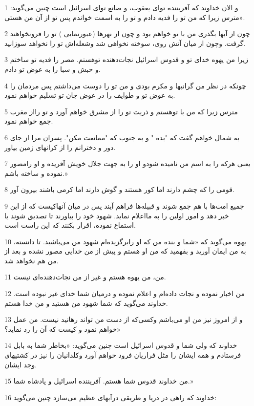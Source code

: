 \par 1 و الان خداوند که آفریننده تو‌ای یعقوب، و صانع تو‌ای اسرائیل است چنین می‌گوید: «مترس زیرا که من تو را فدیه دادم و تو را به اسمت خواندم پس تو از آن من هستی.
\par 2 چون از آبها بگذری من با تو خواهم بود و چون از نهرها (عبورنمایی ) تو را فرونخواهند گرفت. وچون از میان آتش روی، سوخته نخواهی شد وشعله‌اش تو را نخواهد سوزانید.
\par 3 زیرا من یهوه خدای تو و قدوس اسرائیل نجات‌دهنده توهستم. مصر را فدیه تو ساختم و حبش و سبا را به عوض تو دادم.
\par 4 چونکه در نظر من گرانبها و مکرم بودی و من تو را دوست می‌داشتم پس مردمان را به عوض تو و طوایف را در عوض جان تو تسلیم خواهم نمود.
\par 5 مترس زیرا که من با توهستم و ذریت تو را از مشرق خواهم آورد و تو رااز مغرب جمع خواهم نمود.
\par 6 به شمال خواهم گفت که "بده " و به جنوب که "ممانعت مکن". پسران مرا از جای دور و دخترانم را از کرانهای زمین بیاور.
\par 7 یعنی هر‌که را به اسم من نامیده شودو او را به جهت جلال خویش آفریده و او رامصور نموده و ساخته باشم.» 
\par 8 قومی را که چشم دارند اما کور هستند و گوش دارند اما کرمی باشند بیرون آور.
\par 9 جمیع امت‌ها با هم جمع شوند و قبیله‌ها فراهم آیند پس در میان آنهاکیست که از این خبر دهد و امور اولین را به مااعلام نماید. شهود خود را بیاورند تا تصدیق شوند یا استماع نموده، اقرار بکنند که این راست است.
\par 10 یهوه می‌گوید که «شما و بنده من که او رابرگزیده‌ام شهود من می‌باشید. تا دانسته، به من ایمان آورید و بفهمید که من او هستم و پیش از من خدایی مصور نشده و بعد از من هم نخواهد شد.
\par 11 من، من یهوه هستم و غیر از من نجات‌دهنده‌ای نیست.
\par 12 من اخبار نموده و نجات داده‌ام و اعلام نموده و درمیان شما خدای غیر نبوده است. خداوند می‌گوید که شما شهود من هستید و من خدا هستم.
\par 13 و از امروز نیز من او می‌باشم وکسی‌که از دست من تواند رهانید نیست. من عمل خواهم نمود و کیست که آن را رد نماید؟»
\par 14 خداوند که ولی شما و قدوس اسرائیل است چنین می‌گوید: «بخاطر شما به بابل فرستادم و همه ایشان را مثل فراریان فرود خواهم آورد وکلدانیان را نیز در کشتیهای وجد ایشان.
\par 15 من خداوند قدوس شما هستم. آفریننده اسرائیل و پادشاه شما.»
\par 16 خداوند که راهی در دریا و طریقی درآبهای عظیم می‌سازد چنین می‌گوید:
